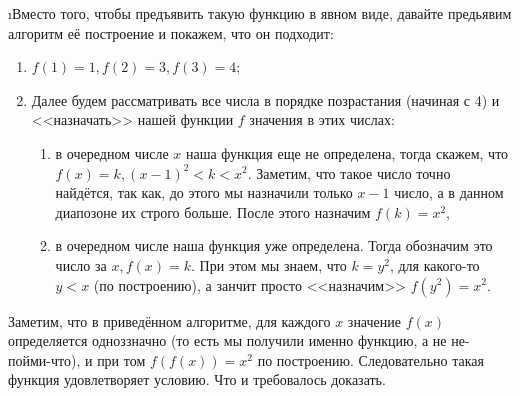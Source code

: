 \i Вместо того, чтобы предъявить такую функцию в явном виде, давайте предьявим алгоритм её построение и покажем, что он подходит:
\begin{enumerate}
    \item $f(1) = 1, f(2) = 3, f(3) = 4$;
    \item Далее будем рассматривать все числа в порядке позрастания (начиная с 4) и <<назначать>> нашей функции $f$ значения в этих числах:
    \begin{enumerate}
        \item в очередном числе $x$ наша функция еще не определена, тогда скажем, что $f(x) = k, (x-1)^2 < k < x^2$. Заметим, что такое число точно найдётся, так как, до этого мы назначили только $x-1$ число, а в данном диапозоне их строго больше. После этого назначим $f(k) = x^2$,
        \item в очередном числе наша функция уже определена. Тогда обозначим это число за $x, f(x) = k$. При этом мы знаем, что $k = y^2$, для какого-то $y < x$ (по построению), а занчит просто <<назначим>> $f(y^2) = x^2$.
    \end{enumerate}
\end{enumerate}
Заметим, что в приведённом алгоритме, для каждого $x$ значение $f(x)$ определяется одноззначно (то есть мы получили именно функцию, а не не-пойми-что), и при том $f(f(x)) = x^2$ по построению. Следовательно такая функция удовлетворяет условию. Что и требовалось доказать.